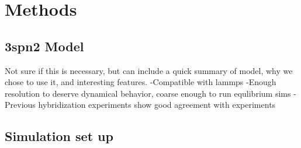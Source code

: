 \documentclass[journal=jpcbfk,manuscript=article]{achemso}
\begin{document}
\section{\label{sec:methods}Methods}


\subsection{\label{sec:methods}3spn2 Model}
Not sure if this is necessary, but can include a quick summary of model, why we chose to use it, and interesting features.
-Compatible with lammps
-Enough resolution to deserve dynamical behavior, coarse enough to run equlibrium sims
-Previous hybridization experiments show good agreement with experiments


\subsection{\label{sec:methods}Simulation set up}
\end{document}
